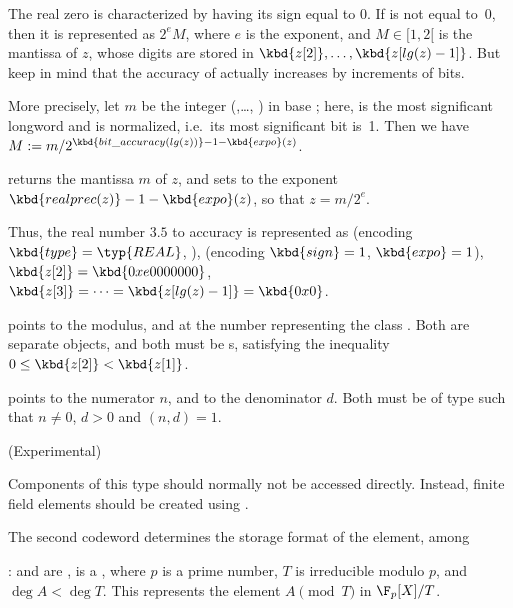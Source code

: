 The real zero is characterized by having its sign equal to 0. If  is
not equal to~0, then it is represented as $2^e M$, where $e$ is the exponent,
and $M\in [1, 2[$ is the mantissa of $z$, whose digits are stored in
$\kbd{z[2]},\dots, \kbd{z[lg(z)-1]}$. But keep in mind that the accuracy of
 actually increases by increments of \B bits.

More precisely, let $m$ be the integer (,\dots, )
in base ; here,  is the most significant
longword and is normalized, i.e.~its most significant bit is~1. Then we have
$M := m / 2^{\kbd{bit\_accuracy(lg(z))} - 1 - \kbd{expo}(z)}$.

 returns the mantissa $m$ of $z$, and
sets  to the exponent $\kbd{realprec(z)}-1-\kbd{expo}(z)$, so that $z = m / 2^e$.

Thus, the real number $3.5$ to accuracy  is
represented as  (encoding $\kbd{type} = \typ{REAL}$, ),
 (encoding $\kbd{sign} = 1$, $\kbd{expo} = 1$), $\kbd{z[2]} =
\kbd{0xe0000000}$, $\kbd{z[3]} =\dots = \kbd{z[lg(z)-1]} = \kbd{0x0}$.

 points to the modulus, and  at the number representing
the class . Both are separate  objects, and both must be
s, satisfying the inequality $0 \le \kbd{z[2]} < \kbd{z[1]}$.

%
 points to the numerator $n$, and  to the denominator
$d$. Both must be of type  such that $n\neq 0$, $d > 0$ and
$(n,d) = 1$.

%
 (Experimental)

Components of this type should normally not be accessed directly. Instead,
finite field elements should be created using .

\noindent The second codeword  determines the storage format of the
element, among

\item {}:  and  are ,
 is a , where $p$ is a prime number, $T$ is irreducible
modulo $p$, and $\deg A < \deg T$.
This represents the element $A\pmod{T}$ in $\F_p[X]/T$.

